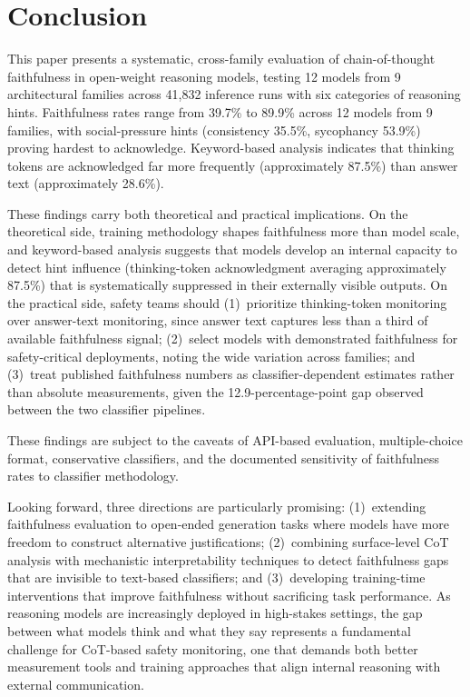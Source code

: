 
\section{Conclusion}

This paper presents a systematic, cross-family evaluation of chain-of-thought
faithfulness in open-weight reasoning models, testing 12 models from 9
architectural families across 41,832 inference runs with six categories of
reasoning hints. Faithfulness rates range from 39.7\% to 89.9\% across 12
models from 9 families, with social-pressure hints (consistency 35.5\%,
sycophancy 53.9\%) proving hardest to acknowledge. Keyword-based analysis
indicates that thinking tokens are acknowledged far more frequently
(approximately 87.5\%) than answer text (approximately 28.6\%).

These findings carry both theoretical and practical implications. On the
theoretical side, training methodology shapes faithfulness more than model
scale, and keyword-based analysis suggests that models develop an internal
capacity to detect hint influence (thinking-token acknowledgment averaging
approximately 87.5\%) that is systematically suppressed in their externally
visible outputs. On the practical
side, safety teams should (1)~prioritize thinking-token monitoring over
answer-text monitoring, since answer text captures less than a third of
available faithfulness signal; (2)~select models with demonstrated faithfulness
for safety-critical deployments, noting the wide variation across families; and
(3)~treat published faithfulness numbers as classifier-dependent estimates rather
than absolute measurements, given the 12.9-percentage-point gap observed
between the two classifier pipelines.

These findings are subject to the caveats of API-based evaluation,
multiple-choice format, conservative classifiers, and the documented sensitivity
of faithfulness rates to classifier methodology.

Looking forward, three directions are particularly promising: (1)~extending
faithfulness evaluation to open-ended generation tasks where models have more
freedom to construct alternative justifications; (2)~combining surface-level
CoT analysis with mechanistic interpretability techniques to detect faithfulness
gaps that are invisible to text-based classifiers; and (3)~developing
training-time interventions that improve faithfulness without sacrificing task
performance. As reasoning models are increasingly deployed in high-stakes
settings, the gap between what models think and what they say represents a
fundamental challenge for CoT-based safety monitoring, one that demands both
better measurement tools and training approaches that align internal reasoning
with external communication.
